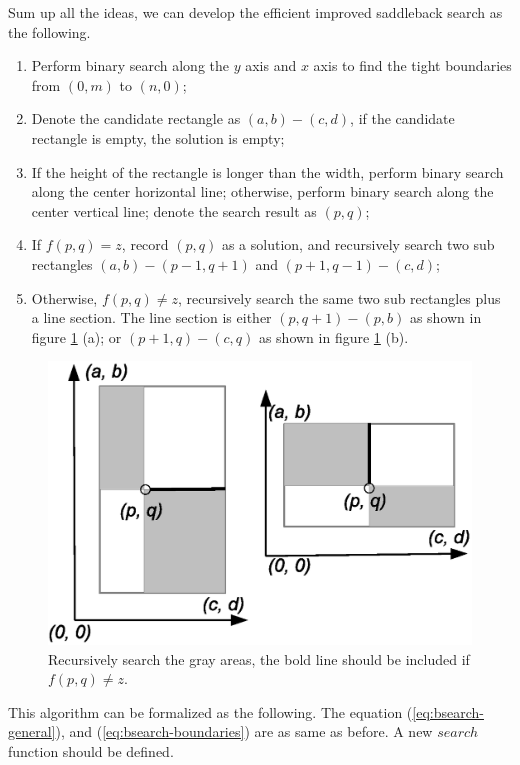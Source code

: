 \documentclass[UTF8]{article}
\begin{document}
Sum up all the ideas, we can develop the efficient improved saddleback search as the following.

\begin{enumerate}
\item Perform binary search along the $y$ axis and $x$ axis to find the tight boundaries from $(0, m)$ to $(n, 0)$;
\item Denote the candidate rectangle as $(a, b) - (c, d)$, if the candidate rectangle is empty, the solution is empty;
\item If the height of the rectangle is longer than the width, perform binary search along the center horizontal line; otherwise, perform binary search along the center vertical line; denote the search result as $(p, q)$;
\item If $f(p, q) = z$, record $(p, q)$ as a solution, and recursively search two sub rectangles $(a, b) - (p-1, q+1)$ and
$(p+1, q-1) - (c, d)$;
\item Otherwise, $f(p, q) \neq z$, recursively search the same two sub rectangles plus a line section. The line section
is either $(p, q+1) - (p, b)$ as shown in figure \ref{fig:include-line} (a); or $(p+1, q) - (c, q)$ as shown in
figure \ref{fig:include-line} (b).
\end{enumerate}

\begin{figure}[htbp]
 \centering
 \includegraphics[scale=0.5]{img/saddleback-include-ln.eps}
 \caption{Recursively search the gray areas, the bold line should be included if $f(p, q) \neq z$.}
 \label{fig:include-line}
\end{figure}

This algorithm can be formalized as the following. The equation (\ref{eq:bsearch-general}), and (\ref{eq:bsearch-boundaries})
are as same as before. A new $search$ function should be defined.
\end{document}
